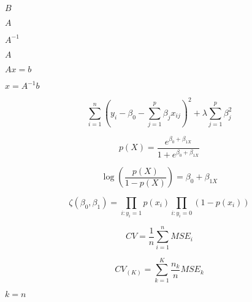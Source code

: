 \documentclass[10pt]{book}
\begin{document}
\begin{mdSnippets}
\begin{mdInlineSnippet}
$B$\end{mdInlineSnippet}%
\begin{mdInlineSnippet}[7fc56270e7a70fa81a5935b72eacbe29]%
$A$\end{mdInlineSnippet}%
\begin{mdInlineSnippet}[1ff4e7c4ea49e4f89fcea2a90968d87f]%
$A^{-1}$\end{mdInlineSnippet}%
\begin{mdInlineSnippet}[7fc56270e7a70fa81a5935b72eacbe29]%
$A$\end{mdInlineSnippet}%
\begin{mdInlineSnippet}[81e6d45a28385d9454465ee4551bd9c7]%
$Ax=b$\end{mdInlineSnippet}%
\begin{mdInlineSnippet}[372507382ff8ba062d3c108071b30eca]%
$x=A^{-1}b$\end{mdInlineSnippet}%
\begin{mdDisplaySnippet}%
\[%
\sum_{i=1}^{n}(y_i-\beta_0-\sum_{j=1}^{p}\beta_j x_{ij})^2+\lambda \sum_{j=1}^{p}\beta_j^2
\]%
\end{mdDisplaySnippet}%
\begin{mdDisplaySnippet}[fa844e2e7d8c97568d2d0301d5147257]%
\[%
p(X)=\frac{e^{\beta_0+\beta_{1X}}}{1+e^{\beta_0+\beta_{1X}}}
\]%
\end{mdDisplaySnippet}%
\begin{mdDisplaySnippet}%
\[%
\log(\frac{p(X)}{1-p(X)}) = \beta_0+\beta_{1X}
\]%
\end{mdDisplaySnippet}%
\begin{mdDisplaySnippet}[3434640df0abf3c9138498896d5d4bb3]%
\[%
  \zeta(\beta_0,\beta_1)= \prod_{i:y_i=1}p(x_i)\prod_{i:y_i=0}(1-p(x_i))
\]%
\end{mdDisplaySnippet}%
\begin{mdDisplaySnippet}%
\[%
  CV=\frac{1}{n}\sum_{i=1}^{n}MSE_i
\]%
\end{mdDisplaySnippet}%
\begin{mdDisplaySnippet}[9ad5431ed4f79d040b8d2e68eb912e33]%
\[%
CV_{(K)}=\sum_{k=1}^{K}\frac{n_k}{n}MSE_k
\]%
\end{mdDisplaySnippet}%
\begin{mdInlineSnippet}[0a4b018f4a1382228c85c71a987d566f]%
$k=n$\end{mdInlineSnippet}%

\end{mdSnippets}
\end{document}
